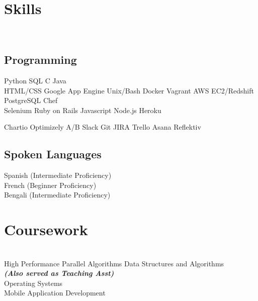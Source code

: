 \documentclass[]{deedy-resume-openfont}
\begin{document}
\begin{minipage}[t]{0.31\textwidth}

\section{Skills}
\\[1\baselineskip]
\subsection{Programming}

Python \textbullet{}  SQL  \textbullet{} C \textbullet{} Java 
\\[1\baselineskip]

HTML/CSS \textbullet{} Google App Engine \textbullet{}  Unix/Bash \textbullet{} Docker \textbullet{}  Vagrant \textbullet{} AWS EC2/Redshift \textbullet{} PostgreSQL \textbullet{}  Chef
\\[1\baselineskip]

Selenium \textbullet{} Ruby on Rails \textbullet{} Javascript \textbullet{}  Node.js \textbullet{}  Heroku  
\sectionsep

Chartio \textbullet{}  Optimizely A/B \textbullet{}  Slack \textbullet{}  Git \textbullet{}  JIRA \textbullet{} Trello \textbullet{} Asana \textbullet{} Reflektiv
\sectionsep

\subsection{Spoken Languages}
Spanish (Intermediate Proficiency) \\
French (Beginner Proficiency)\\
Bengali (Intermediate Proficiency)\\
[1\baselineskip]


\section{Coursework}
\\[1\baselineskip]
High Performance Parallel Algorithms
Data Structures and Algorithms\\
{\footnotesize \textit{\textbf{(Also served as Teaching Asst) }}} \\
Operating Systems\\
Mobile Application Development\\
\sectionsep
%
%

\end{minipage} 
\end{document}
